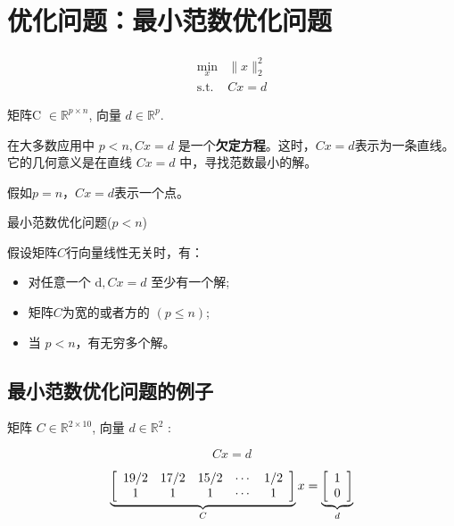 \section{优化问题：最小范数优化问题}

\begin{problem}

$$\begin{aligned}
    \min _{x} &\|x\|_{2}^{2}\\
   \text{s.t.} &C x=d 
\end{aligned}$$

矩阵C $ \in \mathbb{R}^{p \times n} $, 向量 $ d \in \mathbb{R}^{p} $.
\end{problem}


在大多数应用中 $ p<n,  C x=d $ 是一个\textbf{欠定方程}。这时，$C x=d$表示为一条直线。它的几何意义是在直线 $ C x=d $ 中，寻找范数最小的解。

假如$p = n$，$C x=d$表示一个点。

\begin{FigureCenter}{最小范数优化问题($p < n$)}
    
\end{FigureCenter}



假设矩阵$C$行向量线性无关时，有：
\begin{itemize}
    \item 对任意一个 $ \mathrm{d}, C x=d $ 至少有一个解;
    \item 矩阵$C$为宽的或者方的 $ (p \leq n) $;
    \item 当 $ p<n $，有无穷多个解。
\end{itemize}

\subsection{最小范数优化问题的例子}

\begin{problem}
    矩阵 $ C \in \mathbb{R}^{2 \times 10} $, 向量 $ d \in \mathbb{R}^{2} $ :

$$Cx=d$$

$$\displaystyle \underbrace{\left[\begin{array}{ c c c c c }
    19/2 & 17/2 & 15/2 & \cdots  & 1/2\\
    1 & 1 & 1 & \cdots  & 1
    \end{array}\right]}_{C} x=\underbrace{\left[\begin{array}{ l }
    1\\
    0
    \end{array}\right]}_{d}$$
\end{problem}

